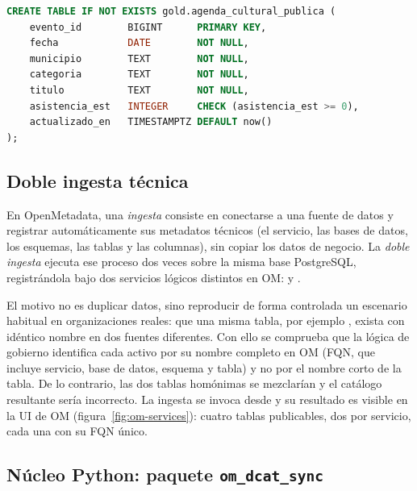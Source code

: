 \begin{lstlisting}[language=SQL, caption={Fragmento de \texttt{sql/opendata\_demo\_init.sql}: tabla publicable de la capa gold.}, label=code:postgres-gold, captionpos=b]
CREATE TABLE IF NOT EXISTS gold.agenda_cultural_publica (
    evento_id        BIGINT      PRIMARY KEY,
    fecha            DATE        NOT NULL,
    municipio        TEXT        NOT NULL,
    categoria        TEXT        NOT NULL,
    titulo           TEXT        NOT NULL,
    asistencia_est   INTEGER     CHECK (asistencia_est >= 0),
    actualizado_en   TIMESTAMPTZ DEFAULT now()
);
\end{lstlisting}

\subsection{Doble ingesta técnica}\label{sec:implementacion-ingesta}

En OpenMetadata, una \emph{ingesta} consiste en conectarse a una fuente de datos y registrar automáticamente sus metadatos técnicos (el servicio, las bases de datos, los esquemas, las tablas y las columnas), sin copiar los datos de negocio. La \emph{doble ingesta} ejecuta ese proceso dos veces sobre la misma base PostgreSQL, registrándola bajo dos servicios lógicos distintos en \ac{OM}:  y .

El motivo no es duplicar datos, sino reproducir de forma controlada un escenario habitual en organizaciones reales: que una misma tabla, por ejemplo , exista con idéntico nombre en dos fuentes diferentes. Con ello se comprueba que la lógica de gobierno identifica cada activo por su nombre completo en \ac{OM} (\ac{FQN}, que incluye servicio, base de datos, esquema y tabla) y no por el nombre corto de la tabla. De lo contrario, las dos tablas homónimas se mezclarían y el catálogo resultante sería incorrecto. La ingesta se invoca desde  y su resultado es visible en la \ac{UI} de \ac{OM} (figura~\ref{fig:om-services}): cuatro tablas publicables, dos por servicio, cada una con su \ac{FQN} único.

\subsection{Núcleo Python: paquete \texttt{om\_dcat\_sync}}\label{sec:implementacion-nucleo}

